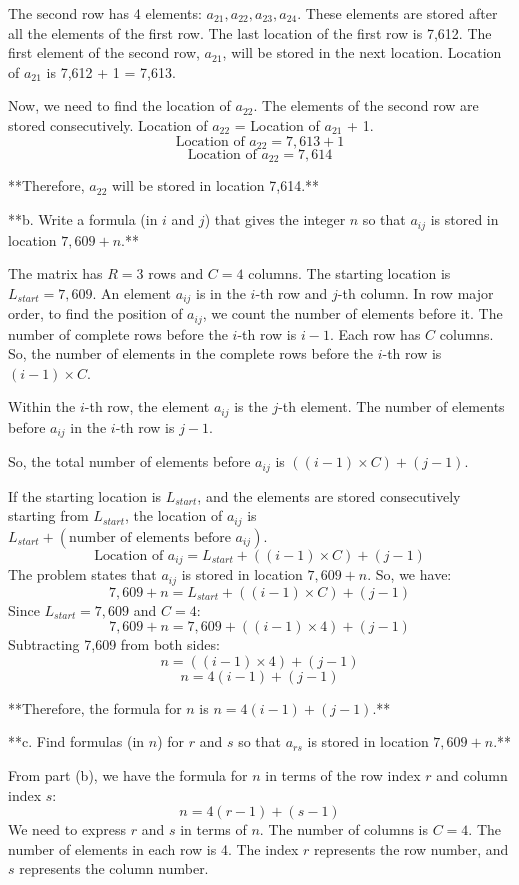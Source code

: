 \documentclass{article}
\begin{document}
The second row has 4 elements: $a_{21}, a_{22}, a_{23}, a_{24}$.
These elements are stored after all the elements of the first row.
The last location of the first row is 7,612.
The first element of the second row, $a_{21}$, will be stored in the next location.
Location of $a_{21}$ is 7,612 + 1 = 7,613.

Now, we need to find the location of $a_{22}$.
The elements of the second row are stored consecutively.
Location of $a_{22}$ = Location of $a_{21}$ + 1.
$$ \text{Location of } a_{22} = 7,613 + 1 $$
$$ \text{Location of } a_{22} = 7,614 $$

**Therefore, $a_{22}$ will be stored in location 7,614.**

**b. Write a formula (in $i$ and $j$) that gives the integer $n$ so that $a_{ij}$ is stored in location $7,609 + n$.**

The matrix has $R = 3$ rows and $C = 4$ columns.
The starting location is $L_{start} = 7,609$.
An element $a_{ij}$ is in the $i$-th row and $j$-th column.
In row major order, to find the position of $a_{ij}$, we count the number of elements before it.
The number of complete rows before the $i$-th row is $i-1$.
Each row has $C$ columns.
So, the number of elements in the complete rows before the $i$-th row is $(i-1) \times C$.

Within the $i$-th row, the element $a_{ij}$ is the $j$-th element.
The number of elements before $a_{ij}$ in the $i$-th row is $j-1$.

So, the total number of elements before $a_{ij}$ is $((i-1) \times C) + (j-1)$.

If the starting location is $L_{start}$, and the elements are stored consecutively starting from $L_{start}$, the location of $a_{ij}$ is $L_{start} + (\text{number of elements before } a_{ij})$.
$$ \text{Location of } a_{ij} = L_{start} + ((i-1) \times C) + (j-1) $$
The problem states that $a_{ij}$ is stored in location $7,609 + n$.
So, we have:
$$ 7,609 + n = L_{start} + ((i-1) \times C) + (j-1) $$
Since $L_{start} = 7,609$ and $C = 4$:
$$ 7,609 + n = 7,609 + ((i-1) \times 4) + (j-1) $$
Subtracting 7,609 from both sides:
$$ n = ((i-1) \times 4) + (j-1) $$
$$ n = 4(i-1) + (j-1) $$

**Therefore, the formula for $n$ is $n = 4(i-1) + (j-1)$.**

**c. Find formulas (in $n$) for $r$ and $s$ so that $a_{rs}$ is stored in location $7,609 + n$.**

From part (b), we have the formula for $n$ in terms of the row index $r$ and column index $s$:
$$ n = 4(r-1) + (s-1) $$
We need to express $r$ and $s$ in terms of $n$.
The number of columns is $C=4$.
The number of elements in each row is 4.
The index $r$ represents the row number, and $s$ represents the column number.
\end{document}
